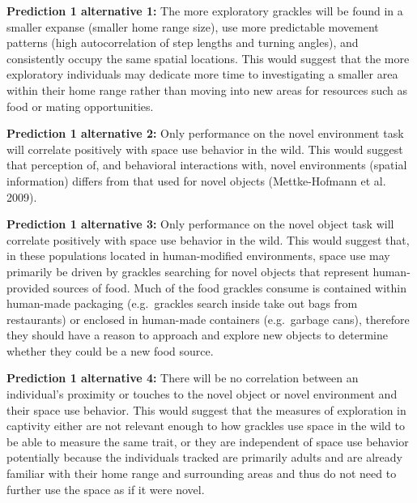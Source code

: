 \documentclass[
]{article}
\begin{document}
\textbf{Prediction 1 alternative 1:} The more exploratory grackles will
be found in a smaller expanse (smaller home range size), use more
predictable movement patterns (high autocorrelation of step lengths and
turning angles), and consistently occupy the same spatial locations.
This would suggest that the more exploratory individuals may dedicate
more time to investigating a smaller area within their home range rather
than moving into new areas for resources such as food or mating
opportunities.

\textbf{Prediction 1 alternative 2:} Only performance on the novel
environment task will correlate positively with space use behavior in
the wild. This would suggest that perception of, and behavioral
interactions with, novel environments (spatial information) differs from
that used for novel objects (Mettke-Hofmann et al. 2009).

\textbf{Prediction 1 alternative 3:} Only performance on the novel
object task will correlate positively with space use behavior in the
wild. This would suggest that, in these populations located in
human-modified environments, space use may primarily be driven by
grackles searching for novel objects that represent human-provided
sources of food. Much of the food grackles consume is contained within
human-made packaging (e.g.~grackles search inside take out bags from
restaurants) or enclosed in human-made containers (e.g.~garbage cans),
therefore they should have a reason to approach and explore new objects
to determine whether they could be a new food source.

\textbf{Prediction 1 alternative 4:} There will be no correlation
between an individual's proximity or touches to the novel object or
novel environment and their space use behavior. This would suggest that
the measures of exploration in captivity either are not relevant enough
to how grackles use space in the wild to be able to measure the same
trait, or they are independent of space use behavior potentially because
the individuals tracked are primarily adults and are already familiar
with their home range and surrounding areas and thus do not need to
further use the space as if it were novel.
\end{document}
